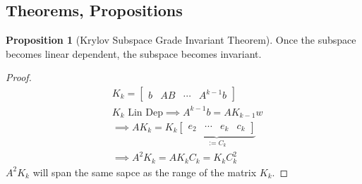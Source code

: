 \documentclass[]{article}
\theoremstyle{definition}
\newtheorem{prop}{Proposition}[section]  %
\begin{document}
    \subsection{Theorems, Propositions}
        \begin{prop}[Krylov Subspace Grade Invariant Theorem]\label{prop:Krylov_Subspace_Grade_Invariant_Theorem}
            Once the subspace becomes linear dependent, the subspace becomes invariant. 
        \end{prop}
        \begin{proof}
            \begin{align}
                & K_k = \begin{bmatrix}
                    b & AB & \cdots & A^{k - 1}b
                \end{bmatrix}
                \\
                & K_k \text{ Lin Dep} \implies A^{k-1}b = AK_{k - 1}w
                \\
                & \implies 
                AK_k = K_k
                    \underbrace{\begin{bmatrix}
                        e_2 & \cdots & e_k & c_k
                    \end{bmatrix}}_{:= C_k}
                \\
                & \implies 
                A^2K_k = AK_kC_k = K_kC_k^2
            \end{align}
            $A^2K_k$ will span the same sapce as the range of the matrix $K_k$. 
        \end{proof}
\newpage


            
\end{document}
